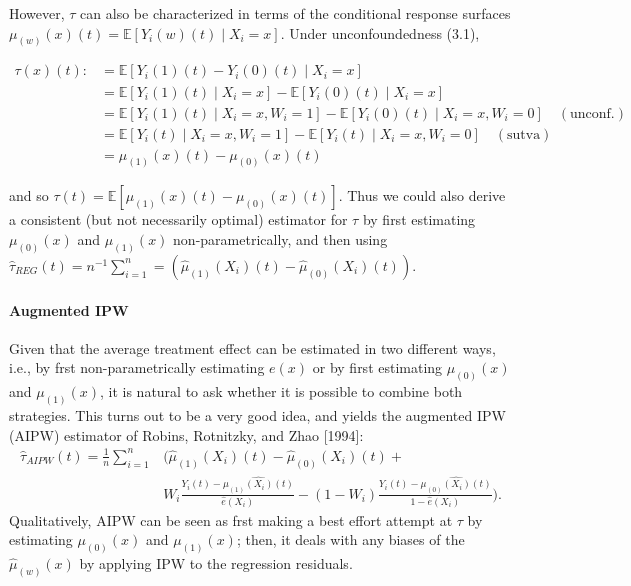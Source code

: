 However, $\tau$ can also be characterized in terms of the conditional response surfaces
$\mu_{(w)}(x)(t) = \mathbb{E}[Y_i(w)(t) \mid X_i = x]$. Under unconfoundedness (3.1),

\begin{align*}
    \tau(x)(t) :&= \mathbb{E}[Y_i(1)(t) - Y_i(0)(t) \mid X_i = x]\\
    &= \mathbb{E}[Y_i(1)(t) \mid X_i = x] - \mathbb{E}[Y_i(0)(t) \mid X_i = x]\\
    &= \mathbb{E}[Y_i(1)(t) \mid X_i = x, W_i = 1] - \mathbb{E}[Y_i(0)(t) \mid X_i = x, W_i = 0] \quad (\text{unconf.})\\
    &= \mathbb{E}[Y_i(t) \mid X_i = x, W_i = 1] - \mathbb{E}[Y_i(t) \mid X_i = x, W_i = 0] \quad (\text{sutva})\\
    &= \mu_{(1)}(x)(t) - \mu_{(0)}(x)(t)
\end{align*}

and so $\tau(t) = \mathbb{E}[\mu_{(1)}(x)(t) - \mu_{(0)}(x)(t)]$. Thus we could also
derive a consistent (but not necessarily optimal) estimator for $\tau$ by first
estimating $\mu_{(0)}(x)$ and $\mu_{(1)}(x)$ non-parametrically, and then using
$\hat{\tau}_{REG}(t) = n^{-1} \sum_{i = 1}^n = (\hat{\mu}_{(1)}(X_i)(t) -
\hat{\mu}_{(0)}(X_i)(t))$.

\paragraph{Augmented IPW}

Given that the average treatment effect can be estimated in two different ways, i.e., by
frst non-parametrically estimating $e(x)$ or by first estimating $\mu_{(0)}(x)$ and
$\mu_{(1)}(x)$, it is natural to ask whether it is possible to combine both strategies.
This turns out to be a very good idea, and yields the augmented IPW (AIPW) estimator of
Robins, Rotnitzky, and Zhao [1994]:
\begin{align}
    \hat{\tau}_{AIPW}(t) = \frac{1}{n} \sum_{i=1}^n &(
    \hat{\mu}_{(1)}(X_i)(t) - \hat{\mu}_{(0)}(X_i)(t) +\\
    &W_i \frac{Y_i(t) - \hat{\mu_{(1)}(X_i)(t)}}{\hat{e}(X_i)} -
    (1 - W_i) \frac{Y_i(t) - \hat{\mu_{(0)}(X_i)(t)}}{1 - \hat{e}(X_i)}
    ).
\end{align}
Qualitatively, AIPW can be seen as frst making a best effort attempt at $\tau$ by
estimating $\mu_{(0)}(x)$ and $\mu_{(1)}(x)$; then, it deals with any biases of the
$\hat{\mu}_{(w)}(x)$ by applying IPW to the regression residuals.

